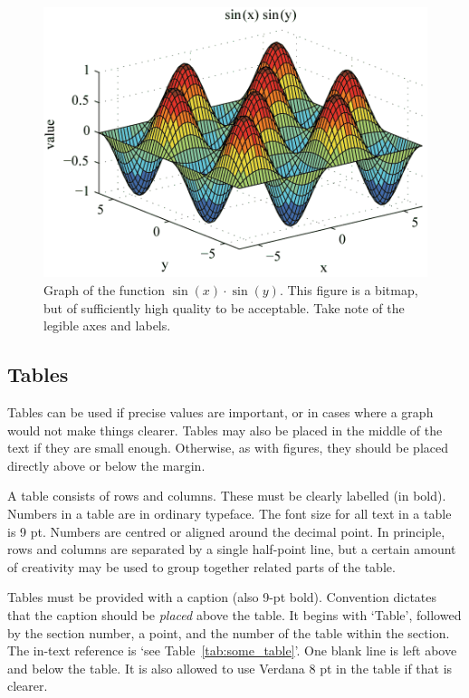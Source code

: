 \begin{figure}[h]
  \centering
  \includegraphics[width=\linewidth]{img/grafiek.png}
  \caption{Graph of the function \(\sin(x) \cdot \sin(y)\).
    This figure is a bitmap, but of sufficiently high quality to be acceptable.
    Take note of the legible axes and labels.
  }\label{fig:afb1}
\end{figure}

\subsection{Tables}\label{sec_tables}
Tables can be used if precise values are important, or in cases where a graph would not make things clearer.
Tables may also be placed in the middle of the text if they are small enough.
Otherwise, as with figures, they should be placed directly above or below the margin.

A table consists of rows and columns.
These must be clearly labelled (in bold).
Numbers in a table are in ordinary typeface.
The font size for all text in a table is 9 pt.
Numbers are centred or aligned around the decimal point.
In principle, rows and columns are separated by a single half-point line, but a certain amount of creativity may be used to group together related parts of the table.

Tables must be provided with a caption (also 9-pt bold).
Convention dictates that the caption should be \emph{placed} above the table.
It begins with `Table', followed by the section number, a point, and the number of the table within the section.
The in-text reference is `see Table~\ref{tab:some_table}'.
One blank line is left above and below the table.
It is also allowed to use Verdana 8 pt in the table if that is clearer.

